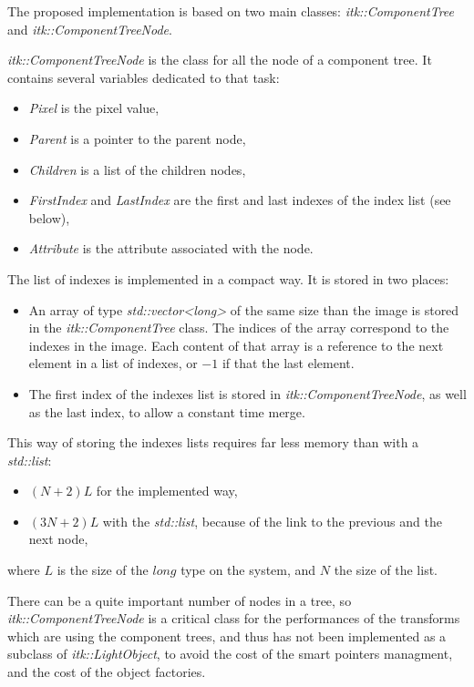 \documentclass{InsightArticle}
\begin{document}
The proposed implementation is based on two main classes: {\em itk::ComponentTree} and {\em itk::ComponentTreeNode}.

{\em itk::ComponentTreeNode} is the class for all the node of a component tree. It contains several variables dedicated to that task:
\begin{itemize}
  \item {\em Pixel} is the pixel value,
  \item {\em Parent} is a pointer to the parent node,
  \item {\em Children} is a list of the children nodes,
  \item {\em FirstIndex} and {\em LastIndex} are the first and last indexes of the index list (see below),
  \item {\em Attribute} is the attribute associated with the node.
\end{itemize}

The list of indexes is implemented in a compact way. It is stored in two places:
\begin{itemize}
  \item An array of type {\em std::vector<long>} of the same size than the image is stored in the {\em itk::ComponentTree} class. The indices of the array correspond to the indexes in the image. Each content of that array is a reference to the next element in a list of indexes, or $-1$ if that the last element.
  \item The first index of the indexes list is stored in {\em itk::ComponentTreeNode}, as well as the last index, to allow a constant time merge.
\end{itemize}
This way of storing the indexes lists requires far less memory than with a {\em std::list}:
\begin{itemize}
  \item $(N+2)L$ for the implemented way,
  \item $(3N+2)L$ with the {\em std::list}, because of the link to the previous and the next node,
\end{itemize}
where $L$ is the size of the $long$ type on the system, and $N$ the size of the list.

There can be a quite important number of nodes in a tree, so {\em itk::ComponentTreeNode} is a critical class for the performances of the transforms which are using the component trees, and thus has not been implemented as a subclass of {\em itk::LightObject}, to avoid the cost of the smart pointers managment, and the cost of the object factories.
\end{document}
